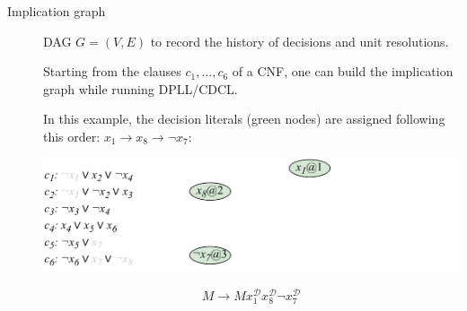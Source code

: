 \begin{description}
    \item[Implication graph]
        DAG $G=(V, E)$ to record the history of decisions and unit resolutions.
        
        \begin{example}
            Starting from the clauses $c_1, \dots, c_6$ of a CNF, one can build the implication graph while running DPLL/CDCL.

            In this example, the decision literals (green nodes) are assigned following this order: $x_1 \rightarrow x_8 \rightarrow \lnot x_7$:
            \begin{center}
                \includegraphics[width=0.8\linewidth]{./img/_cdcl_example1.pdf}
            \end{center}
            \[ M \rightarrow M x_1^\mathcal{D} x_8^\mathcal{D} \lnot x_7^\mathcal{D} \]


\end{example}
\end{description}
